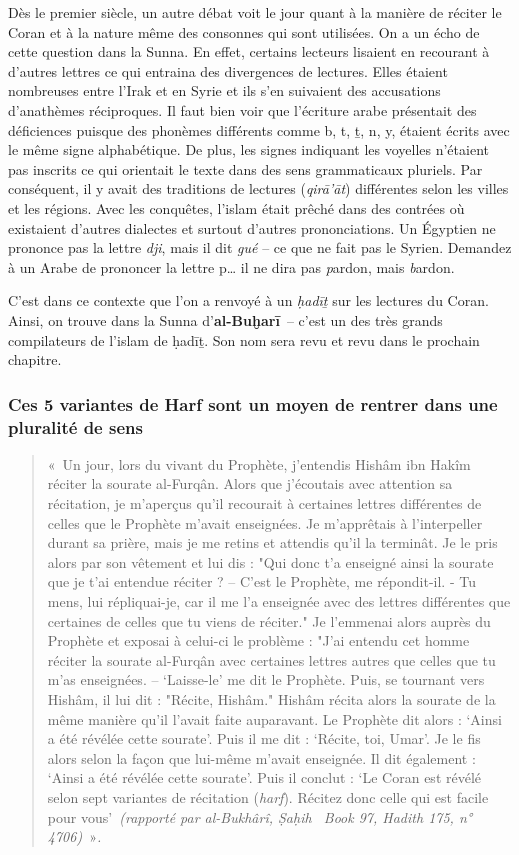 Dès le premier siècle, un autre débat voit le jour quant à la manière de
réciter le Coran et à la nature même des consonnes qui sont utilisées.
On a un écho de cette question dans la Sunna. En effet, certains
lecteurs lisaient en recourant à d'autres lettres ce qui entraina des
divergences de lectures. Elles étaient nombreuses entre l'Irak et en
Syrie et ils s'en suivaient des accusations d'anathèmes réciproques. Il
faut bien voir que l'écriture arabe présentait des déficiences puisque
des phonèmes différents comme b, t, ṯ, n, y, étaient écrits avec le même
signe alphabétique. De plus, les signes indiquant les voyelles n'étaient
pas inscrits ce qui orientait le texte dans des sens grammaticaux
pluriels. Par conséquent, il y avait des traditions de lectures
(\emph{qirā'āt}) différentes selon les villes et les régions. Avec les
conquêtes, l'islam était prêché dans des contrées où existaient d'autres
dialectes et surtout d'autres prononciations. Un Égyptien ne prononce
pas la lettre \emph{dji}, mais il dit \emph{gué} -- ce que ne fait pas
le Syrien. Demandez à un Arabe de prononcer la lettre p\ldots{} il ne
dira pas \emph{p}ardon, mais \emph{b}ardon.

C'est dans ce contexte que l'on a renvoyé à un \emph{ḥadīṯ} sur les
lectures du Coran. Ainsi, on trouve dans la Sunna
d'\textbf{al-Buḫarī}~-- c'est un des très grands compilateurs de l'islam
de ḥadīṯ. Son nom sera revu et revu dans le prochain chapitre.


\subsubsection{Ces 5 variantes de Harf sont un moyen de rentrer dans une
pluralité de
sens}
\begin{quote}
    «~Un jour, lors du vivant du Prophète, j'entendis Hishâm ibn Hakîm
réciter la sourate al-Furqân. Alors que j'écoutais avec attention sa
récitation, je m'aperçus qu'il recourait à certaines lettres différentes
de celles que le Prophète m'avait enseignées. Je m'apprêtais à
l'interpeller durant sa prière, mais je me retins et attendis qu'il la
terminât. Je le pris alors par son vêtement et lui dis : "Qui donc t'a
enseigné ainsi la sourate que je t'ai entendue réciter ? -- C'est le
Prophète, me répondit-il. - Tu mens, lui répliquai-je, car il me l'a
enseignée avec des lettres différentes que certaines de celles que tu
viens de réciter." Je l'emmenai alors auprès du Prophète et exposai à
celui-ci le problème : "J'ai entendu cet homme réciter la sourate
al-Furqân avec certaines lettres autres que celles que tu m'as
enseignées. -- `Laisse-le' me dit le Prophète. Puis, se tournant vers
Hishâm, il lui dit : "Récite, Hishâm." Hishâm récita alors la sourate de
la même manière qu'il l'avait faite auparavant. Le Prophète dit alors :
`Ainsi a été révélée cette sourate'. Puis il me dit : `Récite, toi,
Umar'. Je le fis alors selon la façon que lui-même m'avait enseignée. Il
dit également : `Ainsi a été révélée cette sourate'. Puis il conclut :
`Le Coran est révélé selon sept variantes de récitation (\emph{harf}).
Récitez donc celle qui est facile pour vous'\emph{~(rapporté par
al-Bukhârî, Ṣaḥih ~Book 97, Hadith 175, n° 4706)}~»\emph{.}
\end{quote}


